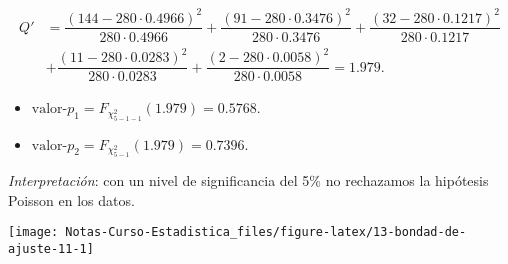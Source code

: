 \documentclass[
  12pt,
]{book}
\newenvironment{Shaded}{\begin{snugshade}}{\end{snugshade}}
\newcommand{\DataTypeTok}[1]{\textcolor[rgb]{0.13,0.29,0.53}{#1}}
\newcommand{\DecValTok}[1]{\textcolor[rgb]{0.00,0.00,0.81}{#1}}
\newcommand{\FloatTok}[1]{\textcolor[rgb]{0.00,0.00,0.81}{#1}}
\newcommand{\KeywordTok}[1]{\textcolor[rgb]{0.13,0.29,0.53}{\textbf{#1}}}
\newcommand{\NormalTok}[1]{#1}
\newcommand{\OperatorTok}[1]{\textcolor[rgb]{0.81,0.36,0.00}{\textbf{#1}}}
\newcommand{\StringTok}[1]{\textcolor[rgb]{0.31,0.60,0.02}{#1}}
\begin{document}
\begin{align*}
Q' & = \dfrac{(144-280\cdot0.4966)^2}{280\cdot0.4966}+\dfrac{(91-280\cdot0.3476)^2}{280\cdot0.3476}+\dfrac{(32-280\cdot0.1217)^2}{280\cdot0.1217}\\
& +\dfrac{(11-280\cdot0.0283)^2}{280\cdot0.0283} +\dfrac{(2-280\cdot0.0058)^2}{280\cdot0.0058} = 1.979.
\end{align*}

\begin{itemize}
\item
  \(\text{valor-}p_1 = F_{\chi^2_{5-1-1}}(1.979) = 0.5768\).
\item
  \(\text{valor-}p_2 = F_{\chi^2_{5-1}}(1.979) = 0.7396\).
\end{itemize}

\emph{Interpretación}: con un nivel de significancia del 5\% no rechazamos la hipótesis Poisson en los datos.

\begin{Shaded}
\end{Shaded}

\begin{center}\texttt{[image: Notas-Curso-Estadistica\_files/figure-latex/13-bondad-de-ajuste-11-1]} \end{center}
\end{document}
